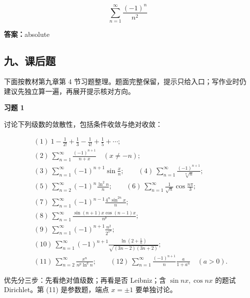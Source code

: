 \begin{quickcheck}
\[
          \sum_{n=1}^{\infty}\frac{(-1)^n}{n^2}
        \]

\tcblower
\textbf{答案：}absolute
\end{quickcheck}

\subsection*{九、课后题}

下面按教材第九章第 4 节习题整理。题面完整保留，提示只给入口；写作业时仍建议先独立算一遍，再展开提示核对方向。

\begin{exercisebox}
\textbf{习题 1 }

讨论下列级数的敛散性，包括条件收敛与绝对收敛：

\[
      \begin{aligned}
      &(1)\ 1-\frac1{2!}+\frac13-\frac1{4!}+\frac15+\cdots;\\
      &(2)\ \sum_{n=1}^{\infty}\frac{(-1)^{n+1}}{n+x}\quad(x\ne -n);\\
      &(3)\ \sum_{n=1}^{\infty}(-1)^{n+1}\sin\frac{x}{n};\qquad
      (4)\ \sum_{n=1}^{\infty}\frac{(-1)^{n+1}}{\sqrt[n]{n}};\\
      &(5)\ \sum_{n=2}^{\infty}(-1)^n\frac{\ln^2 n}{n};\qquad
      (6)\ \sum_{n=1}^{\infty}\frac1{\sqrt n}\cos\frac{n\pi}{3};\\
      &(7)\ \sum_{n=1}^{\infty}(-1)^{n-1}\frac{4^n\sin^{2n}x}{n};\\
      &(8)\ \sum_{n=1}^{\infty}\frac{\sin(n+1)x\cos(n-1)x}{n^p};\\
      &(9)\ \sum_{n=1}^{\infty}(-1)^{n+1}\frac{n^2}{2^{x^n}};\\
      &(10)\ \sum_{n=1}^{\infty}(-1)^{n+1}
      \frac{\ln\left(2+\frac1n\right)}{\sqrt{(3n-2)(3n+2)}};\\
      &(11)\ \sum_{n=2}^{\infty}\frac{x^n}{n^p\ln^q n};\qquad
      (12)\ \sum_{n=1}^{\infty}\frac{(-1)^{n+1}}{n}\frac{a}{1+a^n}\quad(a>0).
      \end{aligned}
      \]

\begin{hintbox}
优先分三步：先看绝对值级数；再看是否 Leibniz；含 \(\sin nx,\cos nx\) 的题试 Dirichlet。第 (11) 是参数题，端点 \(x=\pm1\) 要单独讨论。
\end{hintbox}
\end{exercisebox}

